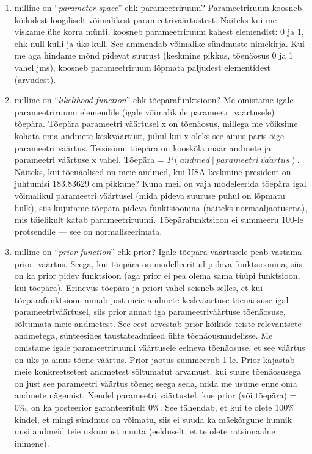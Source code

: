 \documentclass[]{book}
\begin{document}
\begin{enumerate}
\def\labelenumi{\arabic{enumi})}
\item
  milline on ``\emph{parameter space}'' ehk parameetriruum?
  Parameetriruum koosneb kõikidest loogiliselt võimalikest
  parameetriväärtustest. Näiteks kui me viskame ühe korra münti, koosneb
  parameetriruum kahest elemendist: 0 ja 1, ehk null kulli ja üks kull.
  See ammendab võimalike sündmuste nimekirja. Kui me aga hindame mõnd
  pidevat suurust (keskmine pikkus, tõenäosus 0 ja 1 vahel jms), koosneb
  parameetriruum lõpmata paljudest elementidest (arvudest).
\item
  milline on ``\emph{likelihood function}'' ehk tõepärafunktsioon? Me
  omistame igale parameetriruumi elemendile (igale võimalikule
  parameetri väärtusele) tõepära. Tõepära parameetri väärtusel x on
  tõenäosus, millega me võiksime kohata oma andmete keskväärtust, juhul
  kui x oleks see ainus päris õige parameetri väärtus. Teisisõnu,
  tõepära on kooskõla määr andmete ja parameetri väärtuse x vahel.
  Tõepära = \(P(andmed~\vert~parameetri~v\ddot{a}\ddot{a}rtus)\).
  Näiteks, kui tõenäolised on meie andmed, kui USA keskmine president on
  juhtumisi 183.83629 cm pikkune? Kuna meil on vaja modeleerida tõepära
  igal võimalikul parameetri väärtusel (mida pideva suuruse puhul on
  lõpmatu hulk), siis kujutame tõepära pideva funktsioonina (näiteks
  normaaljaotusena), mis täielikult katab parameetriruumi.
  Tõepärafunktsioon ei summeeru 100-le protsendile --- see on
  normaliseerimata.
\item
  milline on ``\emph{prior function}'' ehk prior? Igale tõepära
  väärtusele peab vastama priori väärtus. Seega, kui tõepära on
  modelleeritud pideva funktsioonina, siis on ka prior pidev funktsioon
  (aga prior ei pea olema sama tüüpi funktsioon, kui tõepära). Erinevus
  tõepära ja priori vahel seisneb selles, et kui tõepärafunktsioon annab
  just meie andmete keskväärtuse tõenäosuse igal parameetriväärtusel,
  siis prior annab iga parameetriväärtuse tõenäosuse, sõltumata meie
  andmetest. See-eest arvestab prior kõikide teiste relevantsete
  andmetega, sünteesides taustateadmised ühte tõenäousmudelisse. Me
  omistame igale parameetriruumi väärtusele eelneva tõenäosuse, et see
  väärtus on üks ja ainus tõene väärtus. Prior jaotus summeerub 1-le.
  Prior kajastab meie konkreetsetest andmetest sõltumatut arvamust, kui
  suure tõenäosusega on just see parameetri väärtus tõene; seega seda,
  mida me usume enne oma andmete nägemist. Nendel parameetri väärtustel,
  kus prior (või tõepära) = 0\%, on ka posteerior garanteeritult 0\%.
  See tähendab, et kui te olete 100\% kindel, et mingi sündmus on
  võimatu, siis ei suuda ka mäekõrgune hunnik uusi andmeid teie uskumust
  muuta (eelduselt, et te olete ratsionaalne inimene).
\end{enumerate}
\end{document}
